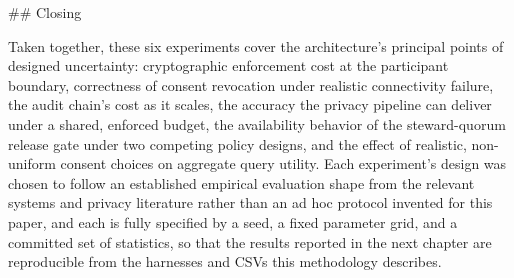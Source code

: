 \#\# Closing

Taken together, these six experiments cover the architecture's principal points of designed uncertainty: cryptographic enforcement cost at the participant boundary, correctness of consent revocation under realistic connectivity failure, the audit chain's cost as it scales, the accuracy the privacy pipeline can deliver under a shared, enforced budget, the availability behavior of the steward-quorum release gate under two competing policy designs, and the effect of realistic, non-uniform consent choices on aggregate query utility. Each experiment's design was chosen to follow an established empirical evaluation shape from the relevant systems and privacy literature rather than an ad hoc protocol invented for this paper, and each is fully specified by a seed, a fixed parameter grid, and a committed set of statistics, so that the results reported in the next chapter are reproducible from the harnesses and CSVs this methodology describes.
